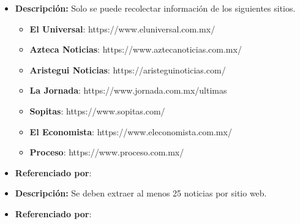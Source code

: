 \begin{itemize}
  \item \textbf{Descripción:} Solo se puede recolectar información de los siguientes sitios.\\

  \begin{itemize}

    \item \textbf{El Universal}: https://www.eluniversal.com.mx/
    \item \textbf{Azteca Noticias}: https://www.aztecanoticias.com.mx/
    \item \textbf{Aristegui Noticias}: https://aristeguinoticias.com/
    \item \textbf{La Jornada}: https://www.jornada.com.mx/ultimas
    \item \textbf{Sopitas}: https://www.sopitas.com/
    \item \textbf{El Economista}: https://www.eleconomista.com.mx/
    \item \textbf{Proceso}: https://www.proceso.com.mx/

  \end{itemize} 
  \item \textbf{Referenciado por}:  \\
\end{itemize}
%


\begin{itemize}
  \item \textbf{Descripción:} Se deben extraer al menos 25 noticias por sitio web.

  \item \textbf{Referenciado por}:  \\
\end{itemize}


